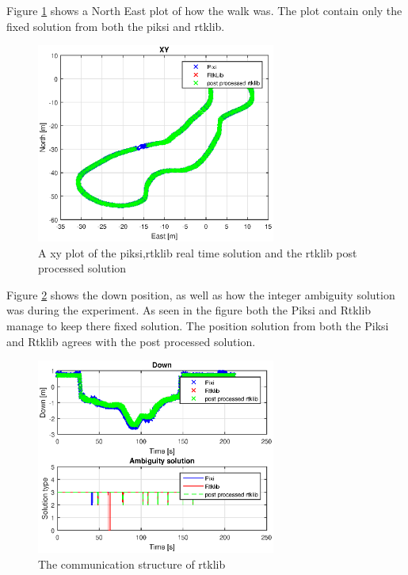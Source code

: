 Figure \ref{figure:xywalk1} shows a North East plot of how the walk was. The plot contain only the fixed solution from both the piksi and rtklib. 
\begin{figure}[H]
	\centering
		\includegraphics[width=0.7\textwidth]{figs/plots/xy.eps}
		\caption{A xy plot of the piksi,rtklib real time solution and the rtklib post processed solution}
		\label{figure:xywalk1}
\end{figure}
Figure \ref{figure:DownAndAmbwalk1} shows the down position, as well as how the integer ambiguity solution was during the experiment. As seen in the figure both the Piksi and Rtklib manage to keep there fixed solution. The position solution from both the Piksi and Rtklib agrees with the post processed solution. 
\begin{figure}[H]
	\centering
		\includegraphics[width=0.7\textwidth]{figs/plots/down.eps}
		\caption{The communication structure of rtklib}
		\label{figure:DownAndAmbwalk1}
\end{figure}

